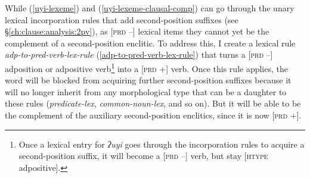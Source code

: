 \begin{singlespacing}
\ex \label{uyi-lexeme-clausal-comp}
\xe
\end{singlespacing}

While (\ref{uyi-lexeme}) and (\ref{uyi-lexeme-clausal-comp}) can go through the unary lexical incorporation rules that add second-position suffixes (see \S\ref{ch:clause:analysis:2pv}), as [\textsc{prd} --] lexical items they cannot yet be the complement of a second-position enclitic. To address this, I create a lexical rule \textit{adp-to-pred-verb-lex-rule} (\ref{adp-to-pred-verb-lex-rule}) that turns a [\textsc{prd} --] adposition or adpositive verb\footnote{Once a lexical entry for \textit{ʔuyi} goes through the incorporation rules to acquire a second-position suffix, it will become a [\textsc{prd} --] verb, but stay [\textsc{htype} adpositive].} into a [\textsc{prd} +] verb. Once this rule applies, the word will be blocked from acquiring further second-position suffixes because it will no longer inherit from any morphological type that can be a daughter to these rules ({\textit{predicate-lex}}, {\textit{common-noun-lex}}, and so on). But it will be able to be the complement of the auxiliary second-position enclitics, since it is now [\textsc{prd} +].

\begin{singlespacing}
\ex \label{adp-to-pred-verb-lex-rule}
\xe
\end{singlespacing}

